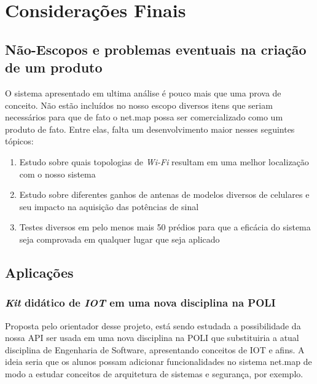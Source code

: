 \chapter{Considerações Finais}



\section{Não-Escopos e problemas eventuais na criação de um produto}
O sistema apresentado em ultima análise é pouco mais que uma prova de conceito. Não estão incluídos no nosso escopo diversos itens que seriam necessários para que de fato o net.map possa ser comercializado como um produto de fato. Entre elas, falta um desenvolvimento maior nesses seguintes tópicos:


\begin{enumerate}
\item Estudo sobre quais topologias de \textit{Wi-Fi} resultam em uma melhor localização com o nosso sistema
\item Estudo sobre diferentes ganhos de antenas de modelos diversos de celulares e seu impacto na aquisição das potências de sinal 
\item Testes diversos em pelo menos mais 50 prédios para que a eficácia do sistema seja comprovada em qualquer lugar que seja aplicado
\end{enumerate}



\section{Aplicações}

\subsection{\textit{Kit} didático de \textit{IOT} em uma nova disciplina na POLI}
Proposta pelo orientador desse projeto, está sendo estudada a possibilidade da nossa API ser usada em uma nova disciplina na POLI que substituiria a atual disciplina de Engenharia de Software, apresentando conceitos de IOT e afins. A ideia seria que os alunos possam adicionar funcionalidades no sistema net.map de modo a estudar conceitos de arquitetura de sistemas e segurança, por exemplo.

